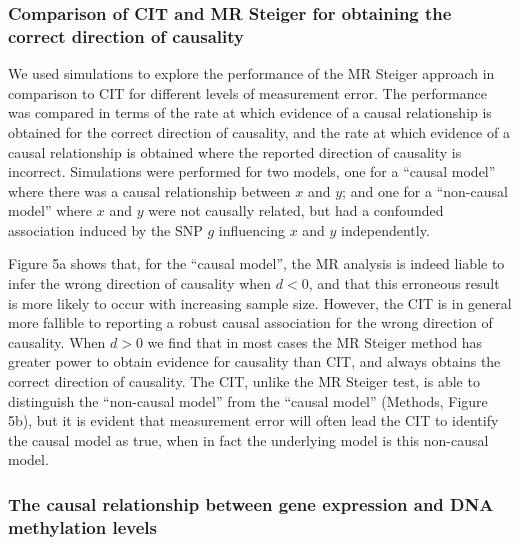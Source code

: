 \documentclass[]{article}
\begin{document}
\hypertarget{comparison-of-cit-and-mr-steiger-for-obtaining-the-correct-direction-of-causality}{%
\subsubsection{Comparison of CIT and MR Steiger for obtaining the
correct direction of
causality}\label{comparison-of-cit-and-mr-steiger-for-obtaining-the-correct-direction-of-causality}}

We used simulations to explore the performance of the MR Steiger
approach in comparison to CIT for different levels of measurement error.
The performance was compared in terms of the rate at which evidence of a
causal relationship is obtained for the correct direction of causality,
and the rate at which evidence of a causal relationship is obtained
where the reported direction of causality is incorrect. Simulations were
performed for two models, one for a ``causal model'' where there was a
causal relationship between \(x\) and \(y\); and one for a ``non-causal
model'' where \(x\) and \(y\) were not causally related, but had a
confounded association induced by the SNP \(g\) influencing \(x\) and
\(y\) independently.

Figure 5a shows that, for the ``causal model'', the MR analysis is
indeed liable to infer the wrong direction of causality when \(d < 0\),
and that this erroneous result is more likely to occur with increasing
sample size. However, the CIT is in general more fallible to reporting a
robust causal association for the wrong direction of causality. When
\(d > 0\) we find that in most cases the MR Steiger method has greater
power to obtain evidence for causality than CIT, and always obtains the
correct direction of causality. The CIT, unlike the MR Steiger test, is
able to distinguish the ``non-causal model'' from the ``causal model''
(Methods, Figure 5b), but it is evident that measurement error will
often lead the CIT to identify the causal model as true, when in fact
the underlying model is this non-causal model.

\hypertarget{the-causal-relationship-between-gene-expression-and-dna-methylation-levels}{%
\subsubsection{The causal relationship between gene expression and DNA
methylation
levels}\label{the-causal-relationship-between-gene-expression-and-dna-methylation-levels}}
\end{document}
